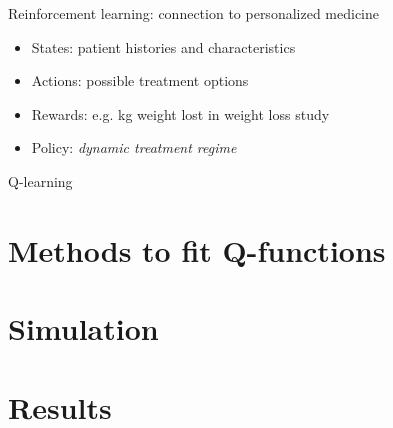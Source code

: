 \documentclass[10pt]{beamer}
\begin{document}
\begin{frame}[c]{Reinforcement learning: connection to personalized medicine}
  
  \begin{itemize}
      \item States: patient histories and characteristics
      \item Actions: possible treatment options
      \item Rewards: e.g. kg weight lost in weight loss study 
      \item Policy: \emph{dynamic treatment regime} 
  \end{itemize}

\end{frame}

\begin{frame}[t]{Q-learning}
  
\end{frame}

%
%



\section{Methods to fit Q-functions} %
\label{sec:methods_to_fit_q_functions}


\section{Simulation} %
\label{sec:simulation}


\section{Results} %
\label{sec:results}

\end{document}
